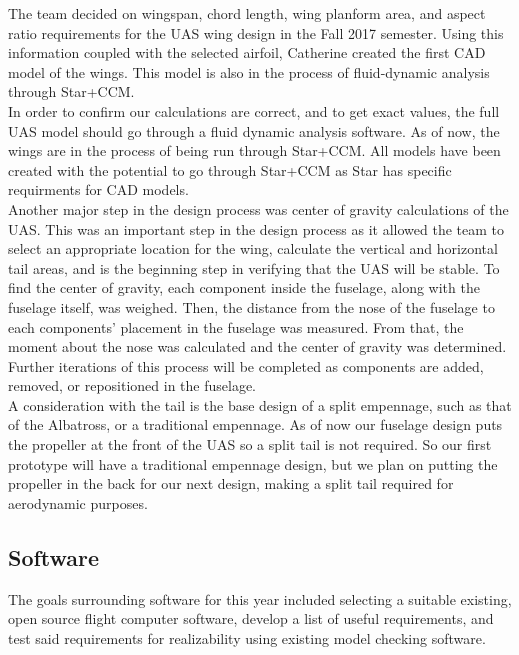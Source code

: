 ﻿\documentclass{article}
\begin{document}
\noindent The team decided on wingspan, chord length, wing planform area, and aspect ratio requirements for the UAS wing design in the Fall 2017 semester. Using this information coupled with the selected airfoil, Catherine created the first CAD model of the wings. This model is also in the process of fluid-dynamic analysis through Star+CCM.\\

\noindent In order to confirm our calculations are correct, and to get exact values, the full UAS model should go through a fluid dynamic analysis software. As of now, the wings are in the process of being run through Star+CCM. All models have been created with the potential to go through Star+CCM as Star has specific requirments for CAD models.\\

\noindent Another major step in the design process was center of gravity calculations of the UAS. This was an important step in the design process as it allowed the team to select an appropriate location for the wing, calculate the vertical and horizontal tail areas, and is the beginning step in verifying that the UAS will be stable. To find the center of gravity, each component inside the fuselage, along with the fuselage itself, was weighed. Then, the distance from the nose of the fuselage to each components’ placement in the fuselage was measured. From that, the moment about the nose was calculated and the center of gravity was determined. Further iterations of this process will be completed as components are added, removed, or repositioned in the fuselage.\\

\noindent A consideration with the tail is the base design of a split empennage, such as that of the Albatross, or a traditional empennage. As of now our fuselage design puts the propeller at the front of the UAS so a split tail is not required. So our first prototype will have a traditional empennage design, but we plan on putting the propeller in the back for our next design, making a split tail required for aerodynamic purposes.\\

\subsection{Software}
\noindent The goals surrounding software for this year included selecting a suitable existing, open source flight computer software, develop a list of useful requirements, and test said requirements for realizability using existing model checking software. \\
\end{document}
